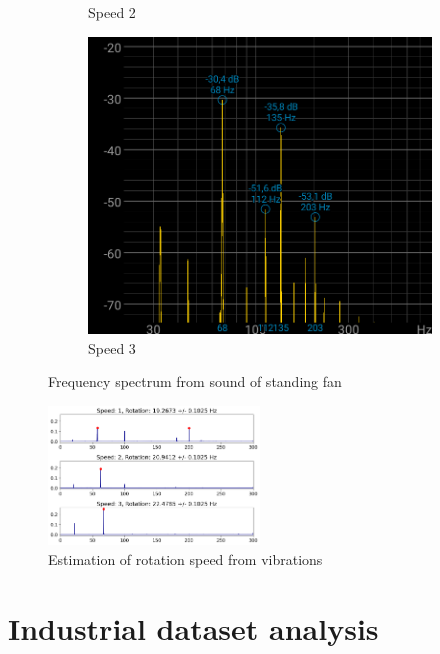 \begin{figure}[ht]
\begin{subfigure}[b]{0.3\textwidth}
        \caption{Speed 2}
    \end{subfigure}
    \hfill
    \begin{subfigure}[b]{0.3\textwidth}
        \includegraphics[width=\textwidth]{assets/results/standing-fan/fan-audio-speed-3.png}
        \caption{Speed 3}
    \end{subfigure}
    \caption{Frequency spectrum from sound of standing fan}
\end{figure}

\begin{figure}[ht]
    \centering
    \includegraphics[width=0.5\textwidth]{assets/results/standing-fan/standing-fan-accel.png}
    \caption{Estimation of rotation speed from vibrations}
\end{figure}



\section{Industrial dataset analysis}

